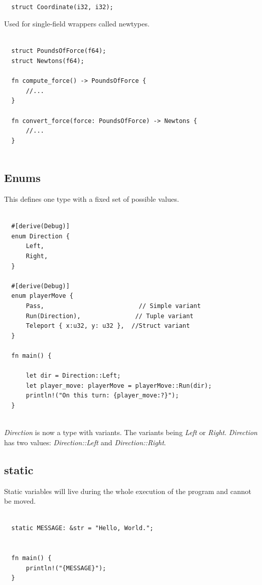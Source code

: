 \documentclass[11pt]{article}
\begin{document}
\begin{verbatim}

  struct Coordinate(i32, i32);

\end{verbatim}

Used for single-field wrappers called newtypes.

\begin{verbatim}

  struct PoundsOfForce(f64);
  struct Newtons(f64);

  fn compute_force() -> PoundsOfForce {
      //...
  }

  fn convert_force(force: PoundsOfForce) -> Newtons {
      //...
  }


\end{verbatim}
\subsection{Enums}
\label{sec:org5e2698a}

This defines one  type with a fixed set of possible values.

\begin{verbatim}

  #[derive(Debug)]
  enum Direction {
      Left,
      Right,
  }

  #[derive(Debug)]
  enum playerMove {
      Pass,                          // Simple variant
      Run(Direction),               // Tuple variant
      Teleport { x:u32, y: u32 },  //Struct variant
  }

  fn main() {

      let dir = Direction::Left;
      let player_move: playerMove = playerMove::Run(dir);
      println!("On this turn: {player_move:?}");
  }


\end{verbatim}

\emph{Direction} is now a type with variants. The variants being \emph{Left} or \emph{Right}.
\emph{Direction} has two values: \emph{Direction::Left} and \emph{Direction::Right}.
\subsection{static}
\label{sec:org423304e}

Static variables will live during the whole execution of the program and cannot be moved.

\begin{verbatim}

  static MESSAGE: &str = "Hello, World.";

  
  fn main() {
      println!("{MESSAGE}");
  }

\end{verbatim}
\end{document}
